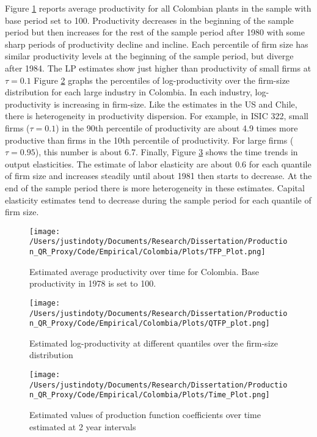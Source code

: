 \documentclass[11pt]{article}
\begin{document}


Figure \ref{fig:COLpgrowth} reports average productivity for all Colombian plants in the sample with base period set to 100. Productivity decreases in the beginning of the sample period but then increases for the rest of the sample period after 1980 with some sharp periods of productivity decline and incline. Each percentile of firm size has similar productivity levels at the beginning of the sample period, but diverge after 1984. The LP estimates show just higher than productivity of small firms at $\tau=0.1$ Figure \ref{fig:COLpdisp} graphs the percentiles of log-productivity over the firm-size distribution for each large industry in Colombia. In each industry, log-productivity is increasing in firm-size. Like the estimates in the US and Chile, there is heterogeneity in productivity dispersion. For example, in ISIC 322, small firms ($\tau=0.1$) in the 90th percentile of productivity are about 4.9 times more productive than firms in the 10th percentile of productivity. For large firms ($\tau=0.95$), this number is about 6.7. Finally, Figure \ref{fig:COLtimecoef} shows the time trends in output elasticities. The estimate of labor elasticity are about 0.6 for each quantile of firm size and increases steadily until about 1981 then starts to decrease. At the end of the sample period there is more heterogeneity in these estimates. Capital elasticity estimates tend to decrease during the sample period for each quantile of firm size.

\begin{figure}[H]
\centering
\texttt{[image: /Users/justindoty/Documents/Research/Dissertation/Production\_QR\_Proxy/Code/Empirical/Colombia/Plots/TFP\_Plot.png]}
\caption{Estimated average productivity over time for Colombia. Base productivity in 1978 is set to 100.}
\label{fig:COLpgrowth}
\end{figure}

\begin{figure}[H]
\centering
\texttt{[image: /Users/justindoty/Documents/Research/Dissertation/Production\_QR\_Proxy/Code/Empirical/Colombia/Plots/QTFP\_plot.png]}
\caption{Estimated log-productivity at different quantiles over the firm-size distribution}
\label{fig:COLpdisp}
\end{figure}


\begin{figure}[H]
\centering
\texttt{[image: /Users/justindoty/Documents/Research/Dissertation/Production\_QR\_Proxy/Code/Empirical/Colombia/Plots/Time\_Plot.png]}
\caption{Estimated values of production function coefficients over time estimated at 2 year intervals}
\label{fig:COLtimecoef}
\end{figure}
\end{document}
